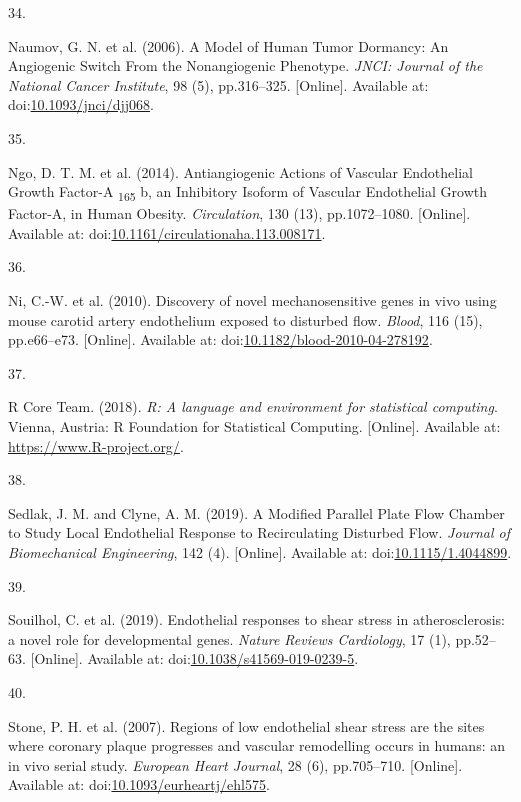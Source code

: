 \documentclass[
  11pt,
]{article}
\newlength{\cslhangindent}
\newlength{\csllabelwidth}
\newlength{\cslentryspacingunit} %
\newenvironment{CSLReferences}[2] %
 {%
  \setlength{\parindent}{0pt}
  \ifodd #1
  \let\oldpar\par
  \def\par{\hangindent=\cslhangindent\oldpar}
  \fi
  \setlength{\parskip}{#2\cslentryspacingunit}
 }%
 {}
\newcommand{\CSLLeftMargin}[1]{\parbox[t]{\csllabelwidth}{#1}}
\newcommand{\CSLRightInline}[1]{\parbox[t]{\linewidth - \csllabelwidth}{#1}\break}
\begin{document}
\begin{CSLReferences}{0}{0}
\leavevmode{}%
\CSLLeftMargin{34. }
\CSLRightInline{Naumov, G. N. {et al.} (2006). {A Model of Human Tumor Dormancy: An Angiogenic Switch From the Nonangiogenic Phenotype}. \emph{JNCI: Journal of the National Cancer Institute}, 98 (5), pp.316--325. {[}Online{]}. Available at: doi:\href{https://doi.org/10.1093/jnci/djj068}{10.1093/jnci/djj068}.}

\leavevmode{}%
\CSLLeftMargin{35. }
\CSLRightInline{Ngo, D. T. M. {et al.} (2014). {Antiangiogenic Actions of Vascular Endothelial Growth Factor-A {\textsubscript{165}} b, an Inhibitory Isoform of Vascular Endothelial Growth Factor-A, in Human Obesity}. \emph{Circulation}, 130 (13), pp.1072--1080. {[}Online{]}. Available at: doi:\href{https://doi.org/10.1161/circulationaha.113.008171}{10.1161/circulationaha.113.008171}.}

\leavevmode{}%
\CSLLeftMargin{36. }
\CSLRightInline{Ni, C.-W. {et al.} (2010). {Discovery of novel mechanosensitive genes in vivo using mouse carotid artery endothelium exposed to disturbed flow}. \emph{Blood}, 116 (15), pp.e66--e73. {[}Online{]}. Available at: doi:\href{https://doi.org/10.1182/blood-2010-04-278192}{10.1182/blood-2010-04-278192}.}

\leavevmode{}%
\CSLLeftMargin{37. }
\CSLRightInline{R Core Team. (2018). {\emph{R: A language and environment for statistical computing}}. Vienna, Austria: R Foundation for Statistical Computing. {[}Online{]}. Available at: \url{https://www.R-project.org/}.}

\leavevmode{}%
\CSLLeftMargin{38. }
\CSLRightInline{Sedlak, J. M. and Clyne, A. M. (2019). {A Modified Parallel Plate Flow Chamber to Study Local Endothelial Response to Recirculating Disturbed Flow}. \emph{Journal of Biomechanical Engineering}, 142 (4). {[}Online{]}. Available at: doi:\href{https://doi.org/10.1115/1.4044899}{10.1115/1.4044899}.}

\leavevmode{}%
\CSLLeftMargin{39. }
\CSLRightInline{Souilhol, C. {et al.} (2019). {Endothelial responses to shear stress in atherosclerosis: a novel role for developmental genes}. \emph{Nature Reviews Cardiology}, 17 (1), pp.52--63. {[}Online{]}. Available at: doi:\href{https://doi.org/10.1038/s41569-019-0239-5}{10.1038/s41569-019-0239-5}.}

\leavevmode{}%
\CSLLeftMargin{40. }
\CSLRightInline{Stone, P. H. {et al.} (2007). {Regions of low endothelial shear stress are the sites where coronary plaque progresses and vascular remodelling occurs in humans: an in vivo serial study}. \emph{European Heart Journal}, 28 (6), pp.705--710. {[}Online{]}. Available at: doi:\href{https://doi.org/10.1093/eurheartj/ehl575}{10.1093/eurheartj/ehl575}.}


\end{CSLReferences}
\end{document}
